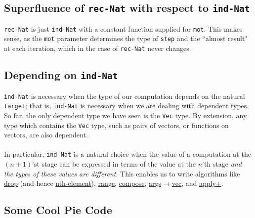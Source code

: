 \documentclass{article}
\newcommand{\ttt}[1]{\texttt{#1}}
\begin{document}
\subsection{Superfluence of \ttt{rec-Nat} with respect to \ttt{ind-Nat}}
\ttt{rec-Nat} is just \ttt{ind-Nat} with a constant function supplied for \ttt{mot}. This makes sense, as the \ttt{mot} parameter determines the type of \ttt{step} and the ``almost result" at each iteration, which in the case of \ttt{rec-Nat} never changes.
\subsection{Depending on \ttt{ind-Nat}}
\ttt{ind-Nat} is necessary when the type of our computation depends on the natural \ttt{target}; that is, \ttt{ind-Nat} is necessary when we are dealing with dependent types. So far, the only dependent type we have seen is the \ttt{Vec} type. By extension, any type which contains the \ttt{Vec} type, such as pairs of vectors, or functions on vectors, are also dependent.
\\ \\
In particular, \ttt{ind-Nat} is a natural choice when the value of a computation at the \((n + 1)\)'st stage can be expressed in terms of the value at the \(n\)'th stage \textit{and the types of these values are different}. This enables us to write algorithms like \hyperref[code:drop]{drop} (and hence \hyperref[code:nth-element]{nth-element}), \hyperref[code:range]{range}, \hyperref[code:compose]{compose}, \hyperref[code:args-to-vec]{args\(\to\)vec}, and \hyperref[code:apply+]{apply+}.
\newpage
\begin{appendix}
\section{Some Cool Pie Code} \label{pie-code-appendix}
\renewcommand{\contentsname}{\normalsize Contents}
\localtableofcontents
\newpage\noindent

\end{appendix}
\end{document}
